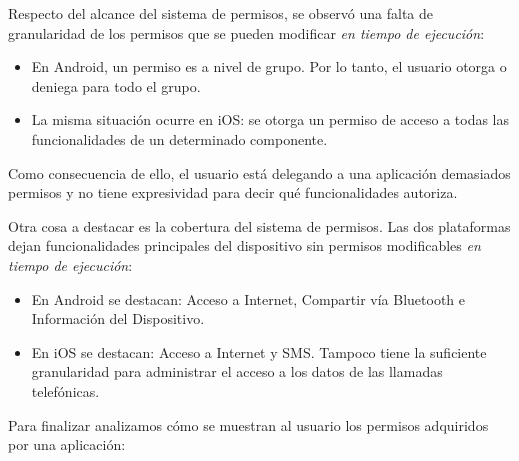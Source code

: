 Respecto del alcance del sistema de permisos, se observó una falta de granularidad de los permisos que se pueden modificar \emph{en tiempo de ejecución}:
  \begin{itemize}
   \item En Android, un permiso es a nivel de grupo. Por lo tanto, el usuario otorga o deniega para todo el grupo.
   \item La misma situación ocurre en iOS: se otorga un permiso de acceso a todas las funcionalidades de un determinado componente.
  \end{itemize}
 Como consecuencia de ello, el usuario está delegando a una aplicación demasiados permisos y no tiene expresividad para decir qué funcionalidades autoriza.

Otra cosa a destacar es la cobertura del sistema de permisos.  Las dos plataformas dejan funcionalidades principales del dispositivo sin permisos modificables \emph{en tiempo de ejecución}:
  \begin{itemize}
   \item En Android se destacan: Acceso a Internet, Compartir vía Bluetooth e Información del Dispositivo.
   \item En iOS se destacan: Acceso a Internet y SMS. Tampoco tiene la suficiente granularidad para administrar el acceso a los datos de las llamadas telefónicas.
  \end{itemize}
Para finalizar analizamos cómo se muestran al usuario los permisos adquiridos por una aplicación: